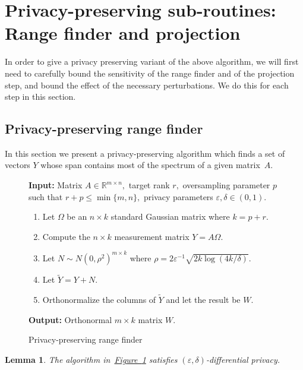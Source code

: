 \documentclass[letterpaper,11pt]{article}
\newtheorem{lemma}[theorem]{Lemma}
\theoremstyle{definition}
\newcommand{\figurelabel}[1]{\label{fig:#1}}
\newcommand{\figureref}[1]{\hyperref[fig:#1]{Figure~\ref{fig:#1}}}
\newcommand{\sectionlabel}[1]{\label{sec:#1}}
\renewcommand{\le}{\leqslant}
\renewcommand{\epsilon}{\varepsilon}
\begin{document}
\section{Privacy-preserving sub-routines: Range finder and projection}
\sectionlabel{range-projection}

In order to give a privacy preserving variant of the above algorithm, we will
first need to carefully bound the sensitivity of the range finder and of the
projection step, and bound the effect of the necessary perturbations. We do
this for each step in this section.


\subsection{Privacy-preserving range finder}
\sectionlabel{range-finder}

In this section we present a privacy-preserving algorithm which finds a set of
vectors $Y$ whose span contains most of the spectrum of a given
matrix~$A.$

\begin{figure}[ht]
\begin{boxedminipage}{\textwidth}
{\bf Input:} Matrix $A\in\mathbb{R}^{m\times n},$ target rank $r,$ oversampling
parameter $p$ such that $r+p\le\min\{m,n\},$ privacy parameters $\epsilon,\delta\in(0,1).$
\begin{enumerate}
\item Let $\Omega$ be an $n\times k$ standard Gaussian matrix where $k=p+r.$
\item Compute the $n\times k$ measurement matrix $Y=A\Omega.$
\item Let $N\sim N(0,\rho^2)^{m\times k}$ where
$\rho=2\epsilon^{-1}\sqrt{2k\log\left(4k/\delta\right)}.$
\item Let $\tilde Y=Y+N.$
\item Orthonormalize the columns of $\tilde Y$ and let the result be $W.$
\end{enumerate}
{\bf Output:} Orthonormal $m\times k$ matrix $W.$
\end{boxedminipage}
\caption{Privacy-preserving range finder}
\figurelabel{range-finder}
\end{figure}

\begin{lemma}
\label{lem:range-privacy}
The algorithm in~\figureref{range-finder} satisfies $(\epsilon,\delta)$-differential
privacy.
\end{lemma}
\end{document}
